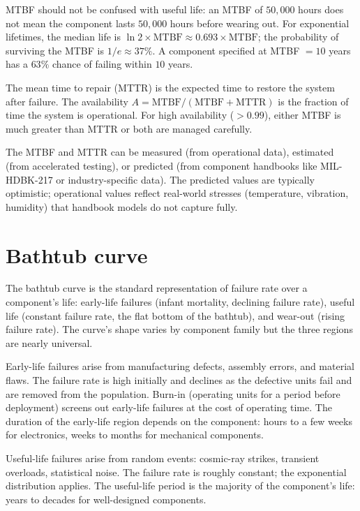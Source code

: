 MTBF should not be confused with useful life: an MTBF of $50{,}000$ hours does not mean the component lasts $50{,}000$ hours before wearing out. For exponential lifetimes, the median life is $\ln 2 \times \text{MTBF} \approx 0.693 \times \text{MTBF}$; the probability of surviving the MTBF is $1/e \approx 37\%$. A component specified at MTBF $= 10$ years has a $63\%$ chance of failing within $10$ years.

The mean time to repair (MTTR) is the expected time to restore the system after failure. The availability $A = \text{MTBF}/(\text{MTBF} + \text{MTTR})$ is the fraction of time the system is operational. For high availability ($> 0.99$), either MTBF is much greater than MTTR or both are managed carefully.

The MTBF and MTTR can be measured (from operational data), estimated (from accelerated testing), or predicted (from component handbooks like MIL-HDBK-217 or industry-specific data). The predicted values are typically optimistic; operational values reflect real-world stresses (temperature, vibration, humidity) that handbook models do not capture fully.

\section{Bathtub curve}

The bathtub curve is the standard representation of failure rate over a component's life: early-life failures (infant mortality, declining failure rate), useful life (constant failure rate, the flat bottom of the bathtub), and wear-out (rising failure rate). The curve's shape varies by component family but the three regions are nearly universal.

Early-life failures arise from manufacturing defects, assembly errors, and material flaws. The failure rate is high initially and declines as the defective units fail and are removed from the population. Burn-in (operating units for a period before deployment) screens out early-life failures at the cost of operating time. The duration of the early-life region depends on the component: hours to a few weeks for electronics, weeks to months for mechanical components.

Useful-life failures arise from random events: cosmic-ray strikes, transient overloads, statistical noise. The failure rate is roughly constant; the exponential distribution applies. The useful-life period is the majority of the component's life: years to decades for well-designed components.

